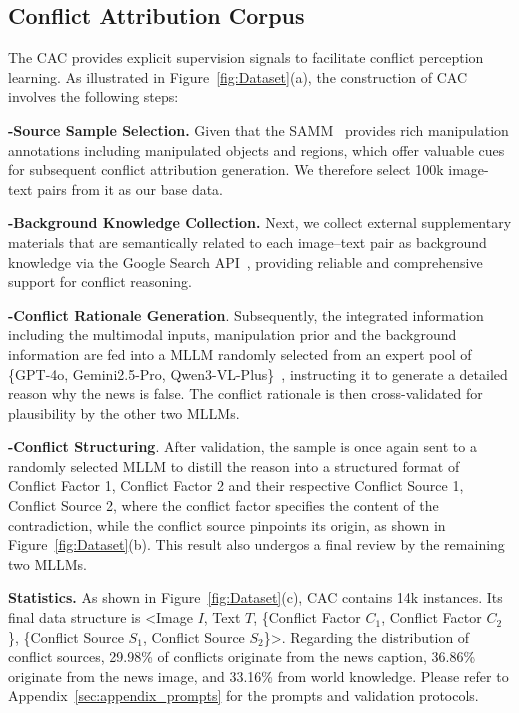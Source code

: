 \documentclass{article}
\theoremstyle{plain}
\theoremstyle{definition}
\theoremstyle{remark}
\begin{document}
\subsection{Conflict Attribution Corpus}
The CAC provides explicit supervision signals to facilitate conflict perception learning.
As illustrated in Figure~\ref{fig:Dataset}(a), the construction of CAC involves the following steps:

\noindent\textbf{-Source Sample Selection.} Given that the SAMM~\cite{samm} provides rich manipulation annotations including manipulated objects and regions, which offer valuable cues for subsequent conflict attribution generation. We therefore select 100k image-text pairs from it as our base data.

\noindent\textbf{-Background Knowledge Collection.} Next, we collect external supplementary materials that are semantically related to each image–text pair as background knowledge via the Google Search API~\cite{googleapi}, providing reliable and comprehensive support for conflict reasoning.

\noindent\textbf{-Conflict Rationale Generation}. Subsequently, the integrated information including the multimodal inputs, manipulation prior and the background information are fed into a MLLM randomly selected from an expert pool of \{GPT-4o, Gemini2.5-Pro, Qwen3-VL-Plus\}~\cite{gpt4o,gemini,qwen3vlplus}, instructing it to generate a detailed reason why the news is false. The conflict rationale is then cross-validated for plausibility by the other two MLLMs.

\noindent\textbf{-Conflict Structuring}. After validation, the sample is once again sent to a randomly selected MLLM to distill the reason into a structured format of {Conflict Factor 1, Conflict Factor 2} and their respective {Conflict Source 1, Conflict Source 2}, where the conflict factor specifies the content of the contradiction, while the conflict source pinpoints its origin, as shown in Figure~\ref{fig:Dataset}(b). This result also undergos a final review by the remaining two MLLMs.

\noindent\textbf{Statistics.}
As shown in Figure~\ref{fig:Dataset}(c), CAC contains 14k instances. Its final data structure is \textless Image $I$, Text $T$, \{Conflict Factor $C_1$, Conflict Factor $C_2$\}, \{Conflict Source $S_1$, Conflict Source $S_2$\}\textgreater. Regarding the distribution of conflict sources, 29.98\% of conflicts originate from the news caption, 36.86\% originate from the news image, and 33.16\% from world knowledge. Please refer to Appendix~\ref{sec:appendix_prompts} for the prompts and validation protocols.
\end{document}
